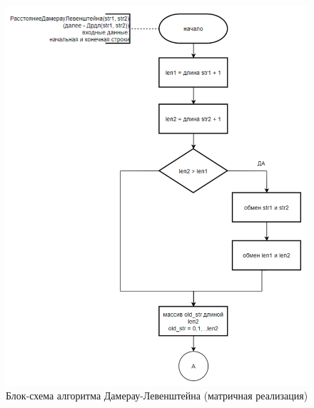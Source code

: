 \begin{figure}[H]
    \centering
    \includegraphics[width=1.05\textwidth]{img/block_2_1_1.png}
    \caption{Блок-схема алгоритма Дамерау-Левенштейна (матричная реализация)}
\end{figure}


